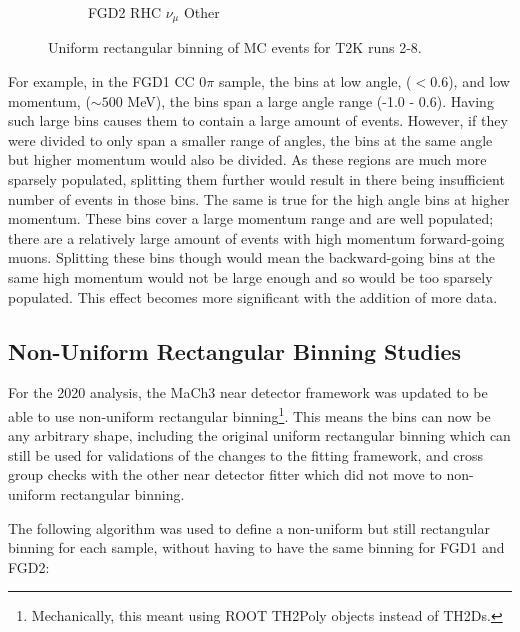 \begin{figure}
\begin{subfigure}{.32\textwidth}
  \caption{FGD2 RHC $\nu_{\mu}$ Other}
  \label{fig:th2dFGD2_NuMuBkg_CCOther_in_AntiNu_Mode}
\end{subfigure}
\caption{Uniform rectangular binning of MC events for T2K runs 2-8.}
\label{fig:th2dbin}
\end{figure}

For example, in the FGD1 CC 0$\pi$ sample, the bins at low angle, ($<0.6$), and low momentum, ($\sim500$ MeV), the bins span a large angle range (-1.0 - 0.6). Having such large bins causes them to contain a large amount of events. However, if they were divided to only span a smaller range of angles, the bins at the same angle but higher momentum would also be divided. As these regions are much more sparsely populated, splitting them further would result in there being insufficient number of events in those bins. The same is true for the high angle bins at higher momentum. These bins cover a large momentum range and are well populated; there are a relatively large amount of events with high momentum forward-going muons. Splitting these bins though would mean the backward-going bins at the same high momentum would not be large enough and so would be too sparsely populated. This effect becomes more significant with the addition of more data.

\subsection{Non-Uniform Rectangular Binning Studies}\label{sec:nonrecbinning}
\enlargethispage{\baselineskip}
For the 2020 analysis, the MaCh3 near detector framework was updated to be able to use non-uniform rectangular binning\footnote{Mechanically, this meant using ROOT\cite{root} TH2Poly objects instead of TH2Ds.}. This means the bins can now be any arbitrary shape, including the original uniform rectangular binning which can still be used for validations of the changes to the fitting framework, and cross group checks with the other near detector fitter which did not move to non-uniform rectangular binning.

The following algorithm was used to define a non-uniform but still rectangular binning for each sample, without having to have the same binning for FGD1 and FGD2:

